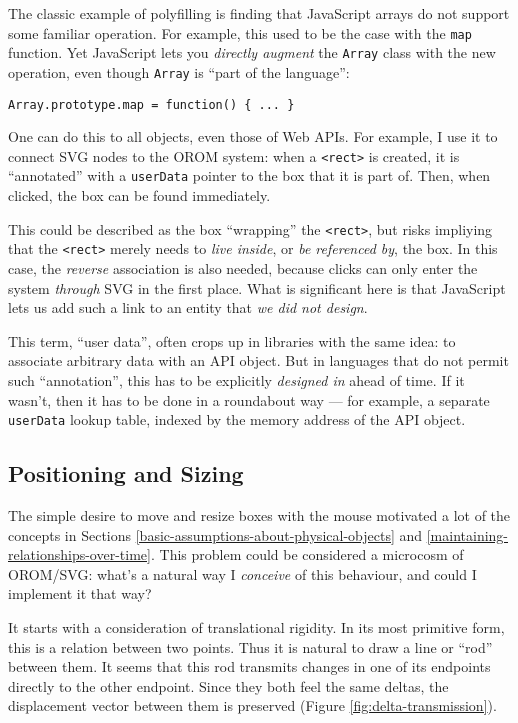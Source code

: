 The classic example of polyfilling is finding that JavaScript arrays do
not support some familiar operation. For example, this used to be the
case with the \texttt{map} function. Yet JavaScript lets you
\emph{directly augment} the \texttt{Array} class with the new operation,
even though \texttt{Array} is ``part of the language'':

\begin{lstlisting}
Array.prototype.map = function() { ... }
\end{lstlisting}

One can do this to all objects, even those of Web APIs. For example, I
use it to connect SVG nodes to the OROM system: when a
\texttt{\textless{}rect\textgreater{}} is created, it is ``annotated''
with a \texttt{userData} pointer to the box that it is part of. Then,
when clicked, the box can be found immediately.

This could be described as the box ``wrapping'' the
\texttt{\textless{}rect\textgreater{}}, but risks impliying that the
\texttt{\textless{}rect\textgreater{}} merely needs to \emph{live
inside}, or \emph{be referenced by}, the box. In this case, the
\emph{reverse} association is also needed, because clicks can only enter
the system \emph{through} SVG in the first place. What is significant
here is that JavaScript lets us add such a link to an entity that
\emph{we did not design}.

This term, ``user data'', often crops up in libraries with the same
idea: to associate arbitrary data with an API object. But in languages
that do not permit such ``annotation'', this has to be explicitly
\emph{designed in} ahead of time. If it wasn't, then it has to be done
in a roundabout way --- for example, a separate \texttt{userData} lookup
table, indexed by the memory address of the API object.

\hypertarget{positioning-and-sizing}{%
\subsection{Positioning and Sizing}\label{positioning-and-sizing}}

The simple desire to move and resize boxes with the mouse motivated a
lot of the concepts in Sections
\ref{basic-assumptions-about-physical-objects} and
\ref{maintaining-relationships-over-time}. This problem could be
considered a microcosm of OROM/SVG: what's a natural way I
\emph{conceive} of this behaviour, and could I implement it that way?

It starts with a consideration of translational rigidity. In its most
primitive form, this is a relation between two points. Thus it is
natural to draw a line or ``rod'' between them. It seems that this rod
transmits changes in one of its endpoints directly to the other
endpoint. Since they both feel the same deltas, the displacement vector
between them is preserved (Figure \ref{fig:delta-transmission}).


